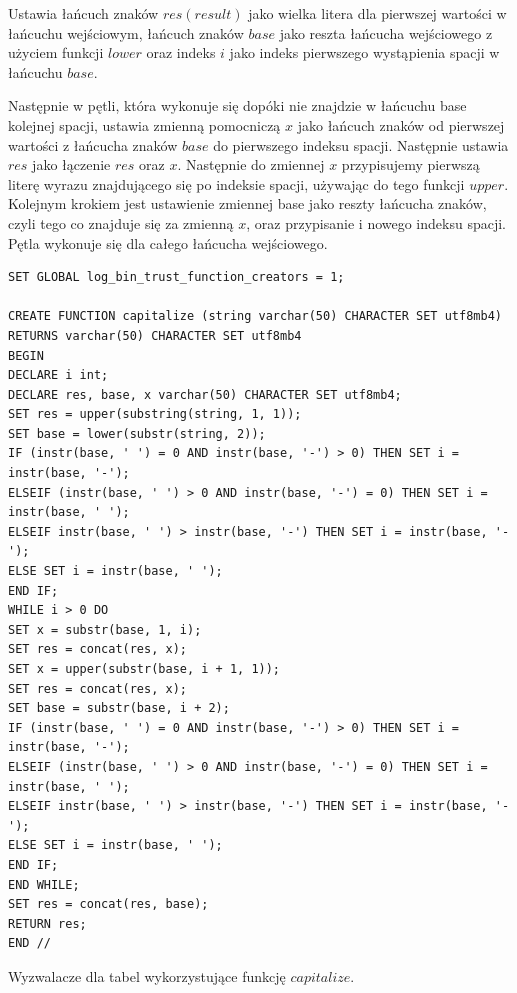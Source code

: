 \documentclass[12pt,a4paper]{article}
\begin{document}
    Ustawia łańcuch znaków $res(result)$ jako wielka litera dla pierwszej wartości w łańcuchu wejściowym, łańcuch znaków $base$ jako reszta łańcucha wejściowego z użyciem funkcji $lower$ oraz indeks $i$ jako indeks pierwszego wystąpienia spacji w łańcuchu $base$.
    
    Następnie w pętli, która wykonuje się dopóki nie znajdzie w łańcuchu base kolejnej spacji, ustawia zmienną pomocniczą $x$ jako łańcuch znaków od pierwszej wartości z łańcucha znaków $base$ do pierwszego indeksu spacji. Następnie ustawia $res$ jako łączenie $res$ oraz $x$. Następnie do zmiennej $x$ przypisujemy pierwszą literę wyrazu znajdującego się po indeksie spacji, używając do tego funkcji $upper$. Kolejnym krokiem jest ustawienie zmiennej base jako reszty łańcucha znaków, czyli tego co znajduje się za zmienną $x$, oraz przypisanie i nowego indeksu spacji. Pętla wykonuje się dla całego łańcucha wejściowego.
    \begin{verbatim}
SET GLOBAL log_bin_trust_function_creators = 1;    
    
CREATE FUNCTION capitalize (string varchar(50) CHARACTER SET utf8mb4)
RETURNS varchar(50) CHARACTER SET utf8mb4
BEGIN
DECLARE i int;
DECLARE res, base, x varchar(50) CHARACTER SET utf8mb4;
SET res = upper(substring(string, 1, 1));
SET base = lower(substr(string, 2));
IF (instr(base, ' ') = 0 AND instr(base, '-') > 0) THEN SET i = instr(base, '-');
ELSEIF (instr(base, ' ') > 0 AND instr(base, '-') = 0) THEN SET i = instr(base, ' ');
ELSEIF instr(base, ' ') > instr(base, '-') THEN SET i = instr(base, '-');
ELSE SET i = instr(base, ' ');
END IF;
WHILE i > 0 DO
SET x = substr(base, 1, i);
SET res = concat(res, x);
SET x = upper(substr(base, i + 1, 1));
SET res = concat(res, x);
SET base = substr(base, i + 2);
IF (instr(base, ' ') = 0 AND instr(base, '-') > 0) THEN SET i = instr(base, '-');
ELSEIF (instr(base, ' ') > 0 AND instr(base, '-') = 0) THEN SET i = instr(base, ' ');
ELSEIF instr(base, ' ') > instr(base, '-') THEN SET i = instr(base, '-');
ELSE SET i = instr(base, ' ');
END IF;
END WHILE;
SET res = concat(res, base);
RETURN res;
END //
    \end{verbatim}
    Wyzwalacze dla tabel wykorzystujące funkcję $capitalize$.
\end{document}
